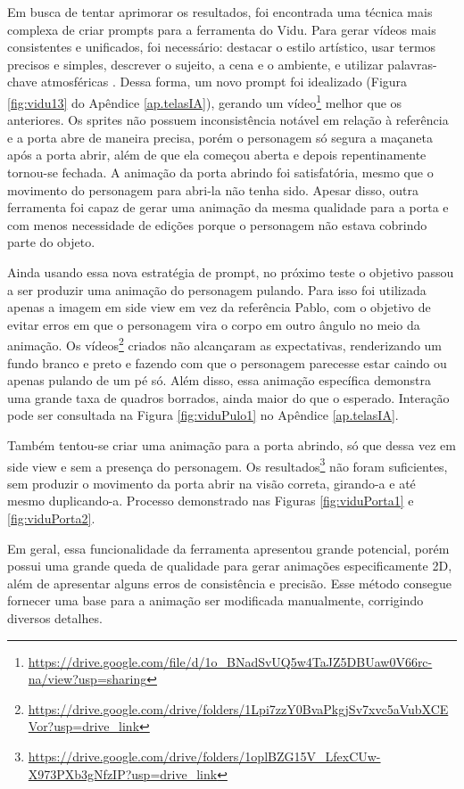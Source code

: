 Em busca de tentar aprimorar os resultados, foi encontrada uma técnica mais complexa de criar prompts para a ferramenta do Vidu. Para gerar vídeos mais consistentes e unificados, foi necessário: destacar o estilo artístico, usar termos precisos e simples, descrever o sujeito, a cena e o ambiente, e utilizar palavras-chave atmosféricas \cite{docs_2025}. Dessa forma, um novo prompt foi idealizado (Figura \ref{fig:vidu13} do Apêndice \ref{ap.telasIA}), gerando um vídeo\footnote{\url{https://drive.google.com/file/d/1o_BNadSvUQ5w4TaJZ5DBUaw0V66rc-na/view?usp=sharing}} melhor que os anteriores. Os sprites não possuem inconsistência notável em relação à referência e a porta abre de maneira precisa, porém o personagem só segura a maçaneta após a porta abrir, além de que ela começou aberta e depois repentinamente tornou-se fechada. A animação da porta abrindo foi satisfatória, mesmo que o movimento do personagem para abri-la não tenha sido. Apesar disso, outra ferramenta foi capaz de gerar uma animação da mesma qualidade para a porta e com menos necessidade de edições porque o personagem não estava cobrindo parte do objeto.

Ainda usando essa nova estratégia de prompt, no próximo teste o objetivo passou a ser produzir uma animação do personagem pulando. Para isso foi utilizada apenas a imagem em side view em vez da referência Pablo, com o objetivo de evitar erros em que o personagem vira o corpo em outro ângulo no meio da animação. Os vídeos\footnote{\url{https://drive.google.com/drive/folders/1Lpi7zzY0BvaPkgjSv7xvc5aVubXCEVor?usp=drive_link}} criados não alcançaram as expectativas, renderizando um fundo branco e preto e fazendo com que o personagem parecesse estar caindo ou apenas pulando de um pé só. Além disso, essa animação específica demonstra uma grande taxa de quadros borrados, ainda maior do que o esperado. Interação pode ser consultada na Figura \ref{fig:viduPulo1} no Apêndice \ref{ap.telasIA}.

Também tentou-se criar uma animação para a porta abrindo, só que dessa vez em side view e sem a presença do personagem. Os resultados\footnote{\url{https://drive.google.com/drive/folders/1oplBZG15V_LfexCUw-X973PXb3gNfzIP?usp=drive_link}} não foram suficientes, sem produzir o movimento da porta abrir na visão correta, girando-a e até mesmo duplicando-a. Processo demonstrado nas Figuras \ref{fig:viduPorta1} e \ref{fig:viduPorta2}.

Em geral, essa funcionalidade da ferramenta apresentou grande potencial, porém possui uma grande queda de qualidade para gerar animações especificamente 2D, além de apresentar alguns erros de consistência e precisão. Esse método consegue fornecer uma base para a animação ser modificada manualmente, corrigindo diversos detalhes.

